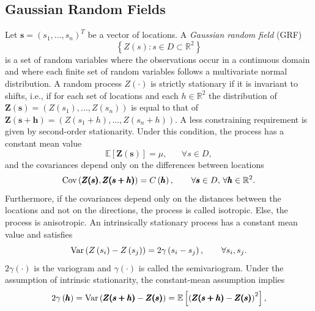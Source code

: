 \subsection{Gaussian Random Fields}
Let $\pmb{s} = \left(s_1,...,s_n\right)^T$ be a vector of locations. A \textit{Gaussian random field} (GRF)
\begin{equation}
    \left\lbrace Z(s):s\in D\subset\mathbb{R}^2\right\rbrace
\end{equation}
is a set of random variables where the observations occur in a continuous domain and where each finite set of random variables follows a multivariate normal distribution. A random process $Z\left(\cdot\right)$ is strictly stationary if it is invariant to shifts, i.e., if for each set of locations and each $h\in\mathbb{R}^2$ the distribution of $\pmb{Z(s)}=\left(Z\left(s_1\right),... ,Z\left(s_n\right)\right)$ is equal to that of $\pmb{Z(s+h)}=\left(Z\left(s_1+h\right),...,Z\left(s_n+h\right)\right)$. A less constraining requirement is given by second-order stationarity. Under this condition, the process has a constant mean value
\begin{equation}
    \mathbb{E}\left[\pmb{Z(s)}\right] = \mu, \hspace{20pt}\forall s\in D,
\end{equation}
and the covariances depend only on the differences between locations
\begin{equation}
    \hbox{Cov}\left(\pmb{Z(s)}, \pmb{Z(s+h)}\right)=C\left(\pmb{h}\right), \hspace{20pt}\forall \pmb{s}\in D,\,\forall \pmb{h}\in\mathbb{R}^2.
\end{equation}
Furthermore, if the covariances depend only on the distances between the locations and not on the directions, the process is called isotropic. Else, the process is anisotropic. An intrinsically stationary process has a constant mean value and satisfies
\begin{equation}
    \hbox{Var}\left(Z\left(s_i\right)-Z\left(s_j\right)\right)=2\gamma\left(s_i-s_j\right),\hspace{20pt}\forall s_i,s_j.
\end{equation}
$2\gamma\left(\cdot\right)$ is the variogram and $\gamma\left(\cdot\right)$ is called the semivariogram. Under the assumption of intrinsic stationarity, the constant-mean assumption implies
\begin{equation*}
    2\gamma\left(\pmb{h}\right)=\hbox{Var}\left(\pmb{Z(s+h)}-\pmb{Z(s)}\right)=\mathbb{E}\left[\left(\pmb{Z(s+h)}-\pmb{Z(s)}\right)^2\right],
\end{equation*}
